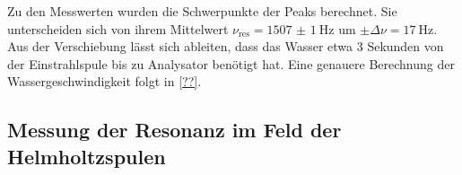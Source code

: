 \documentclass[paper=a4,
	fontsize=10pt,
	DIV=18,
	twocolumn,
	parskip=half
	]{scrartcl}
\numberwithin{equation}{section}    %
\newcommand{\tra}{$\rightarrow$}
\begin{document}
Zu den Messwerten wurden die Schwerpunkte der Peaks berechnet. Sie unterscheiden sich von ihrem Mittelwert $\nu_{\mathrm{res}}=\SI{1507(1)}{\hertz}$ um  $\pm \Delta \nu=\SI{17}{\hertz}$.
Aus der Verschiebung lässt sich ableiten, dass das Wasser etwa $3$ Sekunden von der Einstrahlspule bis zu Analysator benötigt hat.
Eine genauere Berechnung der Wassergeschwindigkeit folgt in \ref{??}.

\subsection{Messung der Resonanz im Feld der Helmholtzspulen}
\label{auswertung6}
\end{document}

